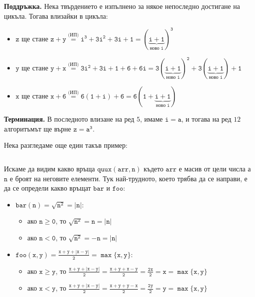 \documentclass{article}
\theoremstyle{definition}
\theoremstyle{plain}
\theoremstyle{remark}
\theoremstyle{definition}
\begin{document}
\textbf{Поддръжка.}
Нека твърдението е изпълнено за някое непоследно достигане на цикъла.
Тогава влизайки в цикъла:
\begin{itemize}
    \item $\mathtt{z \text{ ще стане } z + y \stackrel{\text{(ИП)}}{=} i^3 + 3i^2 + 3i + 1 = (\underbrace{\mathtt{i + 1}}_{\text{ново } i})^3}$
    \item $\mathtt{y \text{ ще стане } y + x \stackrel{\text{(ИП)}}{=} 3i^2 + 3i + 1 + 6 + 6i = 3(\underbrace{\mathtt{i + 1}}_{\text{ново } i})^2 + 3(\underbrace{\mathtt{i + 1}}_{\text{ново } i}) + 1}$
    \item $\mathtt{x \text{ ще стане } x + 6 \stackrel{\text{(ИП)}}{=} 6(1 + i) + 6 = 6(1 + \underbrace{\mathtt{i + 1}}_{\text{ново } i})}$
\end{itemize}

\textbf{Терминация.}
В последното влизане на ред $5$, имаме $\mathtt{i = a}$, и тогава на ред $12$ алгоритъмът ще върне $\mathtt{z = a^3}$.

Нека разгледаме още един такъв пример:
\inputminted[linenos]{c++}{algorithms/quux.cpp}

Искаме да видим какво връща $\mathtt{quux(arr, n)}$ където $\mathtt{arr}$ е масив от цели числа а $\mathtt{n}$ е броят на неговите елементи.
Тук най-трудното, което трябва да се направи, е да се определи какво връщат $\mathtt{bar}$ и $\mathtt{foo}$:
\begin{itemize}
    \item $\mathtt{bar(n) = \sqrt{n ^ 2} = | n |}$:
          \begin{itemize}
              \item ако $\mathtt{n \geq 0}$, то $\mathtt{\sqrt{n^2} = n = | n |}$
              \item ако $\mathtt{n < 0}$, то $\mathtt{\sqrt{n^2} = -n = | n |}$
          \end{itemize}
    \item $\mathtt{foo(x, y) = \frac{x + y + |x - y|}{2}  = \max\{ x, y \}}$:
          \begin{itemize}
              \item ако $\mathtt{x \geq y}$, то $\mathtt{\frac{x + y + |x - y|}{2} = \frac{x + y + x - y}{2} = \frac{2x}{2} = x = \max\{ x, y \}}$
              \item ако $\mathtt{x < y}$, то $\mathtt{\frac{x + y + |x - y|}{2} = \frac{x + y + y - x}{2} = \frac{2y}{2} = y = \max\{ x, y \}}$
          \end{itemize}
\end{itemize}
\end{document}
